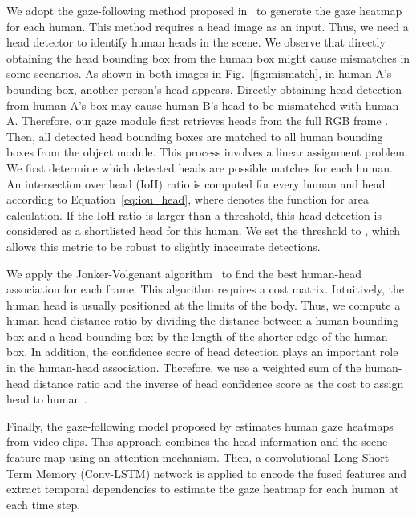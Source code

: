 \documentclass[times,twocolumn,final,authoryear]{elsarticle}
\begin{document}
We adopt the gaze-following method proposed in~\citep{gaze:detecting_attended} to generate the gaze heatmap for each human. This method requires a head image as an input. Thus, we need a head detector to identify human heads in the scene. We observe that directly obtaining the head bounding box from the human box might cause mismatches in some scenarios. As shown in both images in Fig.~\ref{fig:mismatch}, in human A's bounding box, another person's head appears. Directly obtaining head detection from human A's box may cause human B's head to be mismatched with human A. Therefore, our gaze module first retrieves  heads  from the full RGB frame . Then, all detected head bounding boxes are matched to all human bounding boxes from the object module. This process involves a linear assignment problem. We first determine which detected heads are possible matches for each human. An intersection over head (IoH) ratio is computed for every human  and head  according to Equation~\ref{eq:iou_head}, where  denotes the function for area calculation. If the IoH ratio is larger than a threshold, this head detection is considered as a shortlisted head for this human. We set the threshold to , which allows this metric to be robust to slightly inaccurate detections. 



We apply the Jonker-Volgenant algorithm~\citep{assignment:jonker, assignment:new} to find the best human-head association for each frame. This algorithm requires a cost matrix. Intuitively, the human head is usually positioned at the limits of the body. Thus, we compute a human-head distance ratio  by dividing the distance between a human bounding box and a head bounding box by the length of the shorter edge of the human box. In addition, the confidence score of head detection plays an important role in the human-head association. Therefore, we use a weighted sum of the human-head distance ratio  and the inverse of head confidence score as the cost to assign head  to human . 

Finally, the gaze-following model proposed by \citet{gaze:detecting_attended} estimates human gaze heatmaps from video clips. This approach combines the head information and the scene feature map using an attention mechanism. Then, a convolutional Long Short-Term Memory (Conv-LSTM) network is applied to encode the fused features and extract temporal dependencies to estimate the gaze heatmap  for each human  at each time step.
\end{document}
